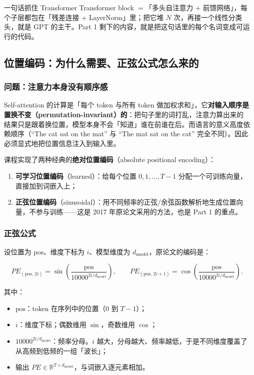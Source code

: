 \begin{importantbox}{一句话抓住 Transformer}
Transformer block $=$「多头自注意力 + 前馈网络」，每个子层都包在「残差连接 + LayerNorm」里；把它堆 $N$ 次，再接一个线性分类头，就是 GPT 的主干。Part 1 剩下的内容，就是把这句话里的每个名词变成可运行的代码。
\end{importantbox}

\subsection{位置编码：为什么需要、正弦公式怎么来的}

\subsubsection{问题：注意力本身没有顺序感}

Self-attention 的计算是「每个 token 与所有 token 做加权求和」，它\textbf{对输入顺序是置换不变（permutation-invariant）的}：把句子里的词打乱，注意力算出来的结果只是跟着换位置，模型本身不会「知道」谁在前谁在后。而语言的意义高度依赖顺序（``The cat sat on the mat'' 与 ``The mat sat on the cat'' 完全不同）。因此必须显式地把位置信息注入到输入里。

课程实现了两种经典的\textbf{绝对位置编码}（absolute positional encoding）：

\begin{enumerate}
\item \textbf{可学习位置编码}（learned）：给每个位置 $0,1,\dots,T-1$ 分配一个可训练向量，直接加到词嵌入上；
\item \textbf{正弦位置编码}（sinusoidal）：用不同频率的正弦/余弦函数解析地生成位置向量，不参与训练——这是 2017 年原论文采用的方法，也是 Part 1 的重点。
\end{enumerate}

\subsubsection{正弦公式}

设位置为 $\text{pos}$、维度下标为 $i$、模型维度为 $d_{\text{model}}$，原论文的编码是：

$$
PE_{(\text{pos},\,2i)} = \sin\!\left(\frac{\text{pos}}{10000^{2i/d_{\text{model}}}}\right), \qquad
PE_{(\text{pos},\,2i+1)} = \cos\!\left(\frac{\text{pos}}{10000^{2i/d_{\text{model}}}}\right).
$$

其中：

\begin{itemize}
\item $\text{pos}$：token 在序列中的位置（$0$ 到 $T-1$）；
\item $i$：维度下标；偶数维用 $\sin$，奇数维用 $\cos$；
\item $10000^{2i/d_{\text{model}}}$：频率分母。$i$ 越大，分母越大、频率越低，于是不同维度覆盖了从高频到低频的一组「波长」；
\item 输出 $PE\in\mathbb{R}^{T\times d_{\text{model}}}$，与词嵌入逐元素相加。
\end{itemize}

